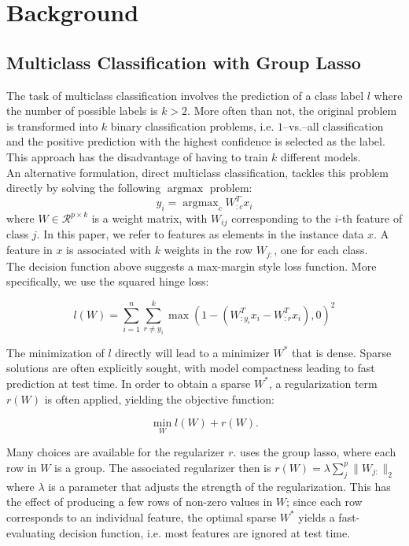 \documentclass[11pt]{article}
\begin{document}
\section{Background}


\subsection{Multiclass Classification with Group Lasso}

The task of multiclass classification involves the prediction of a class label
$l$ where the number of possible labels is $k>2$. More often than not, the 
original problem is transformed into $k$ binary classification problems, i.e.
$1$--vs.--all classification and the positive prediction with the highest 
confidence is selected as the label. This approach has the disadvantage of
having to train $k$ different models.\\

An alternative formulation, direct multiclass classification, tackles this 
problem directly by solving the following $\operatorname{argmax}$ problem:
$$y_i = \operatorname{argmax}_c W_{:c}^T x_i $$
where $W \in \mathcal{R}^{p \times k}$ is a weight matrix, with $W_{ij}$
corresponding to the $i$-th feature of class $j$. In this paper, we refer
to features as elements in the instance data $x$. A feature in $x$ is
associated with $k$ weights in the row $W_{j:}$, one for each class.\\

The decision function above suggests a max-margin style loss function. More
specifically, we use the squared hinge loss:

$$ l(W) = \sum_{i=1}^n \sum_{r\ne y_i}^k 
    \max\left(1 - (W_{:y_i}^Tx_i - W_{:r}^Tx_i), 0\right)^2 $$

The minimization of $l$ directly will lead to a minimizer $W^*$ that is
dense. Sparse solutions are often explicitly sought, with model compactness
leading to fast prediction at test time. In order to obtain a sparse $W^*$,
a regularization term $r(W)$ is often applied, yielding the objective 
function:

$$\min_W l(W) + r(W).$$

Many choices are available for the regularizer $r$. \cite{blondel2013block} uses
the group lasso, where each row in $W$ is a group. The associated regularizer 
then is $r(W) = \lambda\sum_j^p \|W_{j:}\|_2$ where $\lambda$ is a parameter
that adjusts the strength of the regularization.
This has the effect of producing a few rows of non-zero values in $W$;
since each row corresponds to an individual feature, the optimal sparse $W^*$
yields a fast-evaluating decision function, i.e. most features are 
ignored at test time.\\
\end{document}
